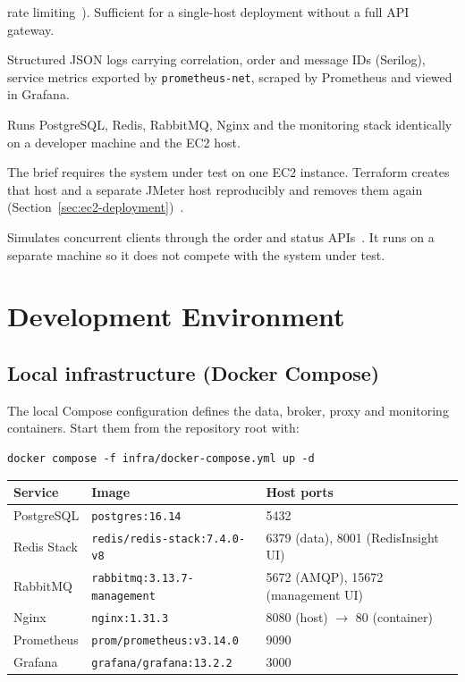 \documentclass[a4paper]{report}
\begin{document}
\begin{description}
    rate limiting~\cite{nginx-limit-req}). Sufficient for a single-host
    deployment without a full API gateway.
  \item[Serilog, prometheus-net, Prometheus, Grafana] Structured JSON logs
    carrying correlation, order and message IDs (Serilog), service metrics
    exported by \texttt{prometheus-net}, scraped by Prometheus and viewed in
    Grafana.
  \item[Docker Compose] Runs PostgreSQL, Redis, RabbitMQ, Nginx and the
    monitoring stack identically on a developer machine and the EC2 host.
  \item[Terraform and AWS EC2] The brief requires the system under test on one
    EC2 instance. Terraform creates that host and a
    separate JMeter host reproducibly and removes them again
    (Section~\ref{sec:ec2-deployment})~\cite{terraform,aws-m7i}.
  \item[Apache JMeter] Simulates concurrent clients through the order and
    status APIs~\cite{jmeter-components}. It runs on a separate machine so it
    does not compete with the system under test.
\end{description}

\chapter{Development Environment}
\label{sec:devenv}

\section{Local infrastructure (Docker Compose)}

The local Compose configuration defines the data, broker, proxy and
monitoring containers. Start them from the repository root with:
\begin{Verbatim}
docker compose -f infra/docker-compose.yml up -d
\end{Verbatim}

\begin{center}
\begin{tabular}{@{}p{2.6cm}p{5.6cm}p{5.2cm}@{}}
\toprule
Service & Image & Host ports \\
\midrule
PostgreSQL & \texttt{postgres:16.14} & 5432 \\
Redis Stack & \texttt{redis/redis-stack:7.4.0-v8} & 6379 (data), 8001 (RedisInsight UI) \\
RabbitMQ & \texttt{rabbitmq:3.13.7-management} & 5672 (AMQP), 15672 (management UI) \\
Nginx & \texttt{nginx:1.31.3} & 8080 (host) $\to$ 80 (container) \\
Prometheus & \texttt{prom/prometheus:v3.14.0} & 9090 \\
Grafana & \texttt{grafana/grafana:13.2.2} & 3000 \\
\bottomrule
\end{tabular}
\end{center}
\end{document}
